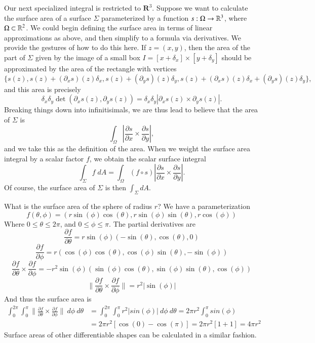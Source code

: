 Our next specialized integral is restricted to $\mathbf{R}^3$. Suppose we want to calculate the surface area of a surface $\Sigma$ parameterized by a function $s: \Omega \to \operatorname{\mathbb{R}}^3$, where $\Omega \subset \operatorname{\mathbb{R}}^2$. We could begin defining the surface area in terms of linear approximations as above, and then simplify to a formula via derivatives. We provide the gestures of how to do this here. If $z = (x,y)$, then the area of the part of $\Sigma$ given by the image of a small box $I = [x + \delta_x] \times [y + \delta_y]$ should be approximated by the area of the rectangle with vertices
%
\[ \{ s(z), s(z) + (\partial_x s)(z) \delta_x, s(z) + (\partial_y s)(z) \delta_y, s(z) + (\partial_x s)(z) \delta_x + (\partial_y s)(z) \delta_y \}, \]
%
and this area is precisely
%
\[ \delta_x \delta_y \det( \partial_x s(z), \partial_y s(z) ) = \delta_x \delta_y |\partial_x s(z) \times \partial_y s(z)|. \]
%
Breaking things down into infinitisimals, we are thus lead to believe that the area of $\Sigma$ is
%
\[ \int_{\Omega} \left| \frac{\partial s}{\partial x} \times \frac{\partial s}{\partial y} \right|, \]
%
and we take this as the definition of the area. When we weight the surface area integral by a scalar factor $f$, we obtain the scalar surface integral
%
\[ \int_\Sigma f\; dA = \int_{\Omega} (f \circ s) \left| \frac{\partial s}{\partial x} \times \frac{\partial s}{\partial y} \right|. \]
%
Of course, the surface area of $\Sigma$ is then $\int_\Sigma dA$.

\begin{example}
  What is the surface area of the sphere of radius $r$? We have a parameterization
%
\[ f(\theta, \phi) = (r\sin(\phi)\cos(\theta), r\sin(\phi)\sin(\theta), r\cos(\phi)) \]
%
Where $0 \leq \theta \leq 2\pi$, and $0 \leq \phi \leq \pi$. The partial derivatives are
%
\[ \frac{\partial f}{\partial \theta} = r\sin(\phi)(-\sin(\theta), \cos(\theta), 0) \]
%
\[ \frac{\partial f}{\partial \phi} = r(\cos(\phi)\cos(\theta), \cos(\phi)\sin(\theta), -\sin(\phi)) \]
%
\[ \frac{\partial f}{\partial \theta} \times \frac{\partial f}{\partial \phi} = -r^2 \sin(\phi)(\sin(\phi)\cos(\theta), \sin(\phi)\sin(\theta), \cos(\phi)) \]
%
\[ \bigg\|\frac{\partial f}{\partial \theta} \times \frac{\partial f}{\partial \phi} \bigg\| = r^2 |\sin(\phi)| \]
%
And thus the surface area is
%
\begin{align*}
    \int_0^{2\pi} \int_0^\pi \bigg\|\frac{\partial f}{\partial \theta} \times \frac{\partial f}{\partial \phi} \bigg\|\ d\phi\ d\theta &= \int_0^{2\pi} \int_0^\pi r^2 |sin(\phi)|\ d\phi\ d\theta = 2\pi r^2 \int_0^\pi sin(\phi)\\
    &= 2\pi r^2 [\cos(0) - \cos(\pi)] = 2\pi r^2 [1 + 1] = 4\pi r^2
\end{align*}
%
Surface areas of other differentiable shapes can be calculated in a similar fashion.
\end{example}

